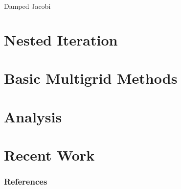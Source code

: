 \documentclass{beamer}
\begin{document}
\begin{frame}[allowframebreaks]{Damped Jacobi}
 
\end{frame}

\section{Nested Iteration}%

\section{Basic Multigrid Methods}%

\section{Analysis}%

\section{Recent Work}%

\begin{frame}[allowframebreaks]
 \frametitle{References}
 
 
\end{frame}
\end{document}
